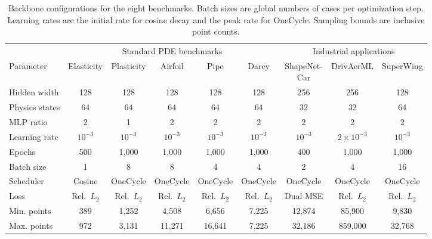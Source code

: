 \begin{table}[!htbp]
    \centering
    \footnotesize
    \caption{Backbone configurations for the eight benchmarks. Batch sizes are global numbers of cases per optimization step. Learning rates are the initial rate for cosine decay and the peak rate for OneCycle. Sampling bounds are inclusive point counts.}
    \label{tab:training_details}
    \setlength{\tabcolsep}{2.3pt}
    \renewcommand{\arraystretch}{1.18}
    \begin{tabular*}{\textwidth}{@{\extracolsep{\fill}}lcccccccc@{}}
        \toprule
        & \multicolumn{5}{c}{Standard PDE benchmarks} & \multicolumn{3}{c}{Industrial applications} \\
        \cmidrule(lr){2-6}\cmidrule(lr){7-9}
        Parameter & Elasticity & Plasticity & Airfoil & Pipe & Darcy
        & \shortstack{ShapeNet-\\Car} & DrivAerML & SuperWing \\
        \midrule
        Hidden width & 128 & 128 & 128 & 128 & 128 & 256 & 256 & 128 \\
        Physics states & 64 & 64 & 64 & 64 & 64 & 32 & 32 & 64 \\
        MLP ratio & 2 & 1 & 2 & 2 & 2 & 2 & 2 & 2 \\
        \midrule
        Learning rate & $10^{-3}$ & $10^{-3}$ & $10^{-3}$ & $10^{-3}$ & $10^{-3}$ & $10^{-3}$ & $2\!\times\!10^{-3}$ & $10^{-3}$ \\
        Epochs & 500 & 1,000 & 1,000 & 1,000 & 1,000 & 400 & 1,000 & 1,000 \\
        Batch size & 1 & 8 & 8 & 4 & 4 & 2 & 4 & 16 \\
        Scheduler & Cosine & OneCycle & OneCycle & OneCycle & OneCycle & OneCycle & OneCycle & OneCycle \\
        Loss & Rel.\ $L_2$ & Rel.\ $L_2$ & Rel.\ $L_2$ & Rel.\ $L_2$ & Rel.\ $L_2$ & Dual MSE & Rel.\ $L_2$ & Rel.\ $L_2$ \\
        \midrule
        Min. points & 389 & 1,252 & 4,508 & 6,656 & 7,225 & 12,874 & 85,900 & 9,830 \\
        Max. points & 972 & 3,131 & 11,271 & 16,641 & 7,225 & 32,186 & 859,000 & 32,768 \\
        \bottomrule
    \end{tabular*}
\end{table}
